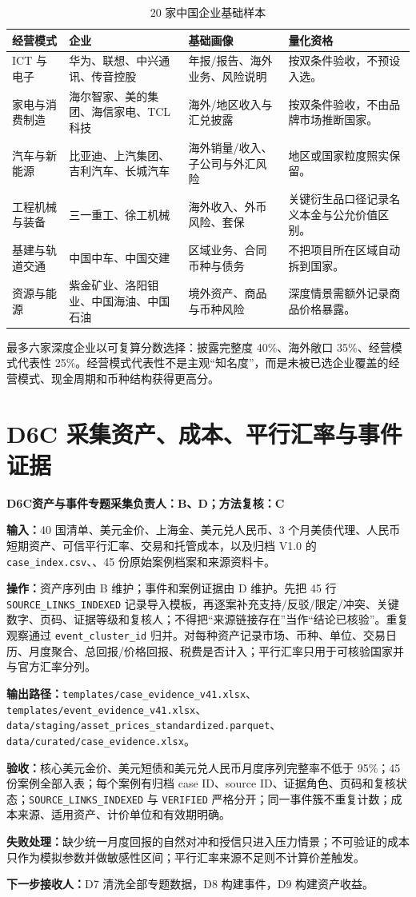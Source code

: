 \documentclass[UTF8,fontset=windows,12pt,openany]{ctexbook}
\newcommand{\Field}[1]{{\small\nolinkurl{#1}}}
\newcommand{\File}[1]{{\small\begingroup\urlstyle{same}\nolinkurl{#1}\endgroup}}
\newcommand{\CFile}[1]{{\small\texttt{\detokenize{#1}}}}
\newcommand{\StepTitle}[3]{%
  \noindent\colorbox{DeepNavy}{\parbox{0.965\textwidth}{\color{white}\Large\bfseries #1\quad #2\hfill\normalsize #3}}\par\medskip
}
\newcommand{\CardRow}[2]{\noindent\textbf{#1：}#2\par}
\begin{document}
\begin{longtable}{p{3.4cm}p{3.8cm}p{3.0cm}p{3.0cm}}
\caption{20 家中国企业基础样本}\label{tab:companies}\\
\toprule
\textbf{经营模式} & \textbf{企业} & \textbf{基础画像} & \textbf{量化资格}\\
\midrule
ICT 与电子 & 华为、联想、中兴通讯、传音控股 & 年报/报告、海外业务、风险说明 & 按双条件验收，不预设入选。\\
家电与消费制造 & 海尔智家、美的集团、海信家电、TCL 科技 & 海外/地区收入与汇兑披露 & 按双条件验收，不由品牌市场推断国家。\\
汽车与新能源 & 比亚迪、上汽集团、吉利汽车、长城汽车 & 海外销量/收入、子公司与外汇风险 & 地区或国家粒度照实保留。\\
工程机械与装备 & 三一重工、徐工机械 & 海外收入、外币风险、套保 & 关键衍生品口径记录名义本金与公允价值区别。\\
基建与轨道交通 & 中国中车、中国交建 & 区域业务、合同币种与债务 & 不把项目所在区域自动拆到国家。\\
资源与能源 & 紫金矿业、洛阳钼业、中国海油、中国石油 & 境外资产、商品与币种风险 & 深度情景需额外记录商品价格暴露。\\
\bottomrule
\end{longtable}

最多六家深度企业以可复算分数选择：披露完整度 40\%、海外敞口 35\%、经营模式代表性 25\%。经营模式代表性不是主观“知名度”，而是未被已选企业覆盖的经营模式、现金周期和币种结构获得更高分。

\newpage
\section{D6C 采集资产、成本、平行汇率与事件证据}
\StepTitle{D6C}{资产与事件专题采集}{负责人：B、D；方法复核：C}
\CardRow{输入}{40 国清单、美元金价、上海金、美元兑人民币、3 个月美债代理、人民币短期资产、可信平行汇率、交易和托管成本，以及归档 V1.0 的 \File{case_index.csv}、\CFile{引用与结论关系.csv}、45 份原始案例档案和来源资料卡。}
\CardRow{操作}{资产序列由 B 维护；事件和案例证据由 D 维护。先把 45 行 \Field{SOURCE_LINKS_INDEXED} 记录导入模板，再逐案补充支持/反驳/限定/冲突、关键数字、页码、证据等级和复核人；不得把“来源链接存在”当作“结论已核验”。重复观察通过 \Field{event_cluster_id} 归并。对每种资产记录市场、币种、单位、交易日历、月度聚合、总回报/价格回报、税费是否计入；平行汇率只用于可核验国家并与官方汇率分列。}
\CardRow{输出路径}{\File{templates/case_evidence_v41.xlsx}、\File{templates/event_evidence_v41.xlsx}、\File{data/staging/asset_prices_standardized.parquet}、\File{data/curated/case_evidence.xlsx}。}
\CardRow{验收}{核心美元金价、美元短债和美元兑人民币月度序列完整率不低于 95\%；45 份案例全部入表；每个案例有归档 case ID、source ID、证据角色、页码和复核状态；\Field{SOURCE_LINKS_INDEXED} 与 \Field{VERIFIED} 严格分开；同一事件簇不重复计数；成本来源、适用资产、计价单位和有效期明确。}
\CardRow{失败处理}{缺少统一月度回报的自然对冲和授信只进入压力情景；不可验证的成本只作为模拟参数并做敏感性区间；平行汇率来源不足则不计算价差触发。}
\CardRow{下一步接收人}{D7 清洗全部专题数据，D8 构建事件，D9 构建资产收益。}
\end{document}
